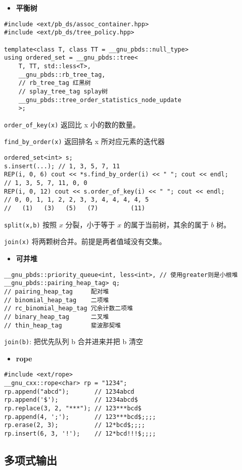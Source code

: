 \documentclass[a4paper,landscape,twocolumn]{ctexart}
\newcommand{\point}[1]{
	\begin{itemize}
		\item \textbf{#1}
	\end{itemize}
}
\begin{document}
\point{平衡树}

\begin{lstlisting}
#include <ext/pb_ds/assoc_container.hpp>
#include <ext/pb_ds/tree_policy.hpp>

template<class T, class TT = __gnu_pbds::null_type>
using ordered_set = __gnu_pbds::tree<
	T, TT, std::less<T>,
	__gnu_pbds::rb_tree_tag,
	// rb_tree_tag 红黑树
	// splay_tree_tag splay树
	__gnu_pbds::tree_order_statistics_node_update
	>;
\end{lstlisting}

\texttt{order\_of\_key(x)}  返回比 x 小的数的数量。

\texttt{find\_by\_order(x)}  返回排名 x 所对应元素的迭代器

\begin{lstlisting}
ordered_set<int> s;
s.insert(...); // 1, 3, 5, 7, 11
REP(i, 0, 6) cout << *s.find_by_order(i) << " "; cout << endl;
// 1, 3, 5, 7, 11, 0, 0
REP(i, 0, 12) cout << s.order_of_key(i) << " "; cout << endl;
// 0, 0, 1, 1, 2, 2, 3, 3, 4, 4, 4, 4, 5
//   (1)   (3)   (5)   (7)         (11)
\end{lstlisting}

\texttt{split(x,b)} 按照 $x$ 分裂，小于等于 $x$ 的属于当前树，其余的属于 $b$ 树。

\texttt{join(x)} 将两颗树合并。前提是两者值域没有交集。

\point{可并堆}

\begin{lstlisting}
__gnu_pbds::priority_queue<int, less<int>, // 使用greater则是小根堆
__gnu_pbds::pairing_heap_tag> q;
// pairing_heap_tag     配对堆
// binomial_heap_tag    二项堆
// rc_binomial_heap_tag 冗余计数二项堆
// binary_heap_tag      二叉堆
// thin_heap_tag        斐波那契堆
\end{lstlisting}

\texttt{join(b)}: 把优先队列 b 合并进来并把 b 清空

\point{rope}

\begin{lstlisting}
#include <ext/rope>
__gnu_cxx::rope<char> rp = "1234";
rp.append("abcd");       // 1234abcd
rp.append('$');          // 1234abcd$
rp.replace(3, 2, "***"); // 123***bcd$
rp.append(4, ';');       // 123***bcd$;;;;
rp.erase(2, 3);          // 12*bcd$;;;;
rp.insert(6, 3, '!');    // 12*bcd!!!$;;;;
\end{lstlisting}

\subsection{多项式输出}
\end{document}
